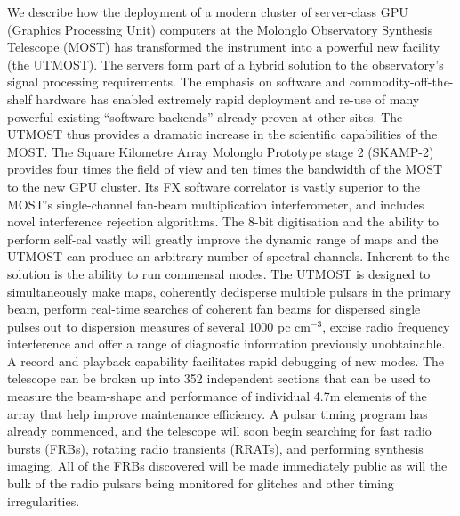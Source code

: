 We describe how the deployment of a modern cluster of server-class GPU (Graphics Processing Unit) computers at the Molonglo Observatory Synthesis Telescope (MOST) has transformed the instrument into a powerful new facility (the UTMOST). The servers form part of a hybrid solution to the observatory's signal processing requirements. The emphasis on software and commodity-off-the-shelf hardware has enabled extremely rapid deployment and re-use of many powerful existing ``software backends'' already proven at other sites. The UTMOST thus provides a dramatic increase in the scientific capabilities of the MOST. The Square Kilometre Array Molonglo Prototype stage 2 (SKAMP-2) provides four times the field of view and ten times the bandwidth of the MOST to the new GPU cluster. Its FX software correlator is vastly superior to the MOST's single-channel fan-beam multiplication interferometer, and includes novel interference rejection algorithms. The 8-bit digitisation and the ability to perform self-cal vastly will greatly improve the dynamic range of maps and the UTMOST can produce an arbitrary number of spectral channels. Inherent to the solution is the ability to run commensal modes. The UTMOST is designed to simultaneously make maps, coherently dedisperse multiple pulsars in the primary beam, perform real-time searches of coherent fan beams for dispersed single pulses out to dispersion measures of several 1000 pc cm$^{-3}$, excise radio frequency interference and offer a range of diagnostic information previously unobtainable. A record and playback capability facilitates rapid debugging of new modes. The telescope can be broken up into 352 independent sections that can be used to measure the beam-shape and performance of individual 4.7m elements of the array that help improve maintenance efficiency. A pulsar timing program has already commenced, and the telescope will soon begin searching for fast radio bursts (FRBs), rotating radio transients (RRATs), and performing synthesis imaging. All of the FRBs discovered will be made immediately public as will the bulk of the radio pulsars being monitored for glitches and other timing irregularities. 
